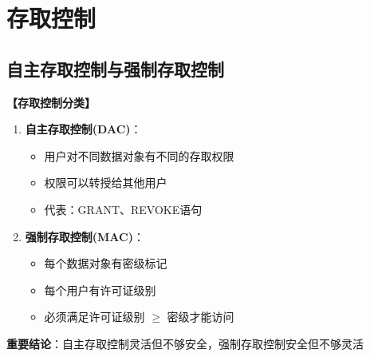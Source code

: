 \documentclass[12pt, a4paper]{article}
\newenvironment{bluebox}[1]{%
  \begin{trivlist}
  \item[\hskip\labelsep \textbf{#1}]
  \setlength{\parskip}{0.5ex}
  \setlength{\itemsep}{0.5ex}
}{%
  \end{trivlist}
}
\begin{document}
\section{存取控制}

\subsection{自主存取控制与强制存取控制}

\begin{bluebox}{存取控制}
	\textbf{【存取控制分类】}

	\begin{enumerate}[leftmargin=*, label=\textbf{\arabic*.}]
		\item \textbf{自主存取控制(DAC)}：
		      \begin{itemize}
			      \item 用户对不同数据对象有不同的存取权限
			      \item 权限可以转授给其他用户
			      \item 代表：GRANT、REVOKE语句
		      \end{itemize}
		\item \textbf{强制存取控制(MAC)}：
		      \begin{itemize}
			      \item 每个数据对象有密级标记
			      \item 每个用户有许可证级别
			      \item 必须满足许可证级别 $\ge$ 密级才能访问
		      \end{itemize}
	\end{enumerate}

	\textbf{重要结论}：自主存取控制灵活但不够安全，强制存取控制安全但不够灵活
\end{bluebox}
\end{document}
